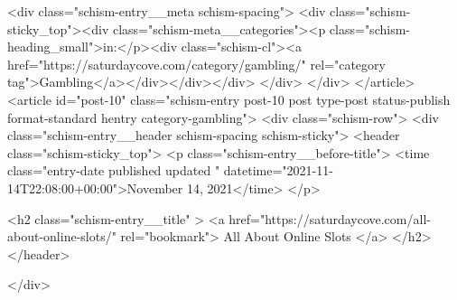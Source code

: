 {		<div class="schism-entry__meta schism-spacing">			<div class="schism-sticky_top"><div class="schism-meta__categories"><p class="schism-heading_small">in:</p><div class="schism-cl"><a href="https://saturdaycove.com/category/gambling/" rel="category tag">Gambling</a></div></div></div>		</div>
	</div>
</article>
<article id="post-10" class="schism-entry post-10 post type-post status-publish format-standard hentry category-gambling">
	<div class="schism-row">		<div class="schism-entry__header schism-spacing schism-sticky">			<header class="schism-sticky_top">				<p class="schism-entry__before-title">
					<time class="entry-date published updated " datetime="2021-11-14T22:08:00+00:00">November 14, 2021</time>				</p>

				<h2 class="schism-entry__title" >
					<a href="https://saturdaycove.com/all-about-online-slots/" rel="bookmark">
						All About Online Slots					</a>
				</h2>
			</header>

					</div>

}
